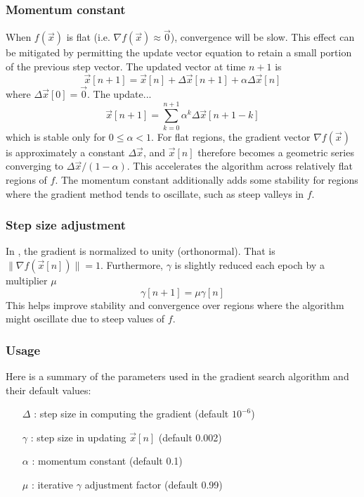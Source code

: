 \subsubsection{Momentum constant}
When $f(\vec{x})$ is flat (i.e. $\nabla f(\vec{x})\approx \vec{0}$),
convergence will be slow.
This effect can be mitigated by permitting the update vector equation to
retain a small portion of the previous step vector.
The updated vector at time $n+1$ is
\[
    \vec{x}[n+1] = \vec{x}[n] + \Delta\vec{x}[n+1] + \alpha\Delta\vec{x}[n]
\]
where $\Delta\vec{x}[0] = \vec{0}$.
The update...
\[
    \vec{x}[n+1] = 
        \sum_{k=0}^{n+1}{\alpha^{k}\Delta\vec{x}[n+1-k]}
\]
which is stable only for $0 \le \alpha < 1$.
For flat regions, the gradient vector $\nabla f(\vec{x})$ is approximately a
constant $\Delta\vec{x}$, and $\vec{x}[n]$ therefore becomes a geometric
series converging to $\Delta\vec{x}/(1-\alpha)$.
This accelerates the algorithm across relatively flat regions of $f$.
The momentum constant additionally adds some stability for regions where the
gradient method tends to oscillate, such as steep valleys in $f$.

\subsubsection{Step size adjustment}
In \liquid, the gradient is normalized to unity (orthonormal).
That is $\|\nabla f(\vec{x}[n])\|=1$.
Furthermore, $\gamma$ is slightly reduced each epoch by a multiplier $\mu$
\[
    \gamma[n+1] = \mu \gamma[n]
\]
This helps improve stability and convergence over regions where the algorithm
might oscillate due to steep values of $f$.

\subsubsection{Usage}
Here is a summary of the parameters used in the gradient search algorithm and
their default values:
\begin{itemize}
\item[$\Delta$] : step size in computing the gradient (default $10^{-6}$)
\item[$\gamma$] : step size in updating $\vec{x}[n]$ (default 0.002)
\item[$\alpha$] : momentum constant (default 0.1)
\item[$\mu$]    : iterative $\gamma$ adjustment factor (default 0.99)
\end{itemize}

